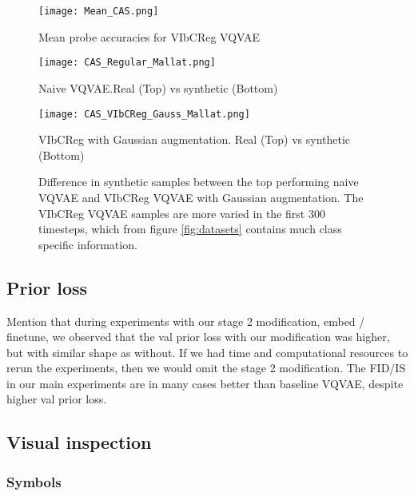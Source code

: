 \documentclass[../../thesis.tex]{subfiles}
\begin{document}
\begin{figure}[H]
    \label{fig:Mean_CAS}
    \texttt{[image: Mean\_CAS.png]}
    \centering  
    \caption{Mean probe accuracies for VIbCReg VQVAE}
\end{figure}



\begin{figure}[H]
    \label{fig:RvsS_Mallat}
    \centering
    \begin{minipage}[b]{0.4\textwidth}
        \centering
        \texttt{[image: CAS\_Regular\_Mallat.png]}
        \caption*{Naive VQVAE.\newline Real (Top) vs synthetic (Bottom)}
    \end{minipage}
    \begin{minipage}[b]{0.4\textwidth}
        \centering
        \texttt{[image: CAS\_VIbCReg\_Gauss\_Mallat.png]}
        \caption*{VIbCReg with Gaussian augmentation. Real (Top) vs synthetic (Bottom)}
    \end{minipage}

    \caption{Difference in synthetic samples between the top performing naive VQVAE and VIbCReg VQVAE with Gaussian augmentation. The VIbCReg VQVAE samples are more varied in the first 300 timesteps, which from figure \ref{fig:datasets} contains much class specific information.}
\end{figure}


\subsection{Prior loss}
Mention that during experiments with our stage 2 modification, embed / finetune, we observed that the val prior loss with our modification was higher, but with similar shape as without. If we had time and computational resources to rerun the experiments, then we would omit the stage 2 modification. The FID/IS in our main experiments are in many cases better than baseline VQVAE, despite higher val prior loss.
\newline



\subsection{Visual inspection}

\subsubsection{Symbols}
\end{document}

